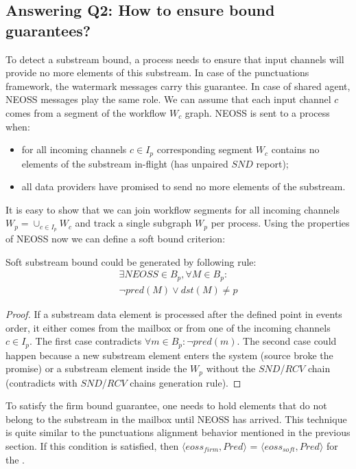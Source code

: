 \subsection{Answering Q2: How to ensure bound guarantees?}
To detect a substream bound, a process needs to ensure that input channels will provide no more elements of this substream. In case of the punctuations framework, the watermark messages carry this guarantee. In case of shared agent, NEOSS messages play the same role. We can assume that each input channel $c$ comes from a segment of the workflow $W_c$ graph. NEOSS is sent to a process when:
\begin{itemize}
    \item for all incoming channels $c \in I_p$ corresponding segment $W_c$ contains no elements of the substream in-flight (has unpaired $SND$ report);
    \item all data providers have promised to send no more elements of the substream.
\end{itemize}
It is easy to show that we can join workflow segments for all incoming channels $W_p = \cup_{c\in I_p} W_c$ and track a single subgraph $W_p$ per process. Using the properties of NEOSS now we can define a soft bound criterion:
\begin{lemma}
Soft substream bound could be generated by following rule:
\begin{multline}
 \exists NEOSS \in B_p, \forall M\in B_p : \\ \neg pred(M) \vee dst(M) \ne p
\end{multline}
\end{lemma}
\begin{proof}
If a substream data element is processed after the defined point in events order, it either comes from the mailbox or from one of the incoming channels $c \in I_p$. The first case contradicts $\forall m\in B_p : \neg pred(m)$. The second case could happen because a new substream element enters the system (source broke the promise) or a substream element inside the $W_p$ without the $SND$/$RCV$ chain (contradicts with $SND$/$RCV$ chains generation rule). 
\end{proof}

To satisfy the firm bound guarantee, one needs to hold elements that do not belong to the substream in the mailbox until NEOSS has arrived. This technique is quite similar to the punctuations alignment behavior mentioned in the previous section. If this condition is satisfied, then $\langle eoss_{firm}, Pred\rangle$ = $\langle eoss_{soft}, Pred\rangle$ for the \tracker.

